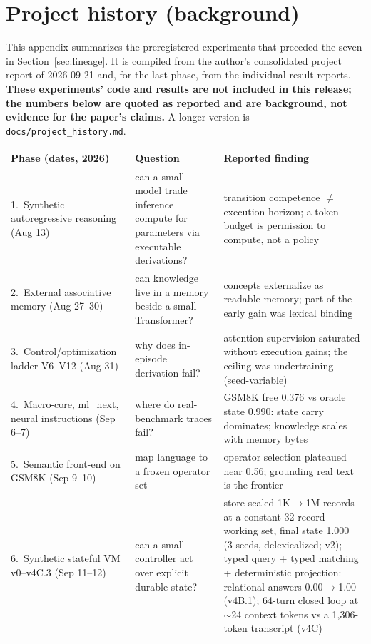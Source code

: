 \documentclass[10pt]{article}
\newcommand{\id}[1]{\nolinkurl{#1}}
\begin{document}
\section{Project history (background)}\label{app:history}
This appendix summarizes the preregistered experiments that preceded the seven in Section~\ref{sec:lineage}. It is compiled from the author's consolidated project report of 2026-09-21 and, for the last phase, from the individual result reports. \textbf{These experiments' code and results are not included in this release; the numbers below are quoted as reported and are background, not evidence for the paper's claims.} A longer version is \id{docs/project_history.md}.

\begin{center}\small
\begin{tabularx}{\linewidth}{@{}>{\raggedright}p{3.3cm}>{\raggedright}p{4.2cm}>{\raggedright\arraybackslash}X@{}}
\toprule
Phase (dates, 2026) & Question & Reported finding \\
\midrule
1.~Synthetic autoregressive reasoning (Aug 13) & can a small model trade inference compute for parameters via executable derivations? & transition competence $\ne$ execution horizon; a token budget is permission to compute, not a policy \\
2.~External associative memory (Aug 27--30) & can knowledge live in a memory beside a small Transformer? & concepts externalize as readable memory; part of the early gain was lexical binding \\
3.~Control/optimization ladder V6--V12 (Aug 31) & why does in-episode derivation fail? & attention supervision saturated without execution gains; the ceiling was undertraining (seed-variable) \\
4.~Macro-core, ml\_next, neural instructions (Sep 6--7) & where do real-benchmark traces fail? & GSM8K free 0.376 vs oracle state 0.990: state carry dominates; knowledge scales with memory bytes \\
5.~Semantic front-end on GSM8K (Sep 9--10) & map language to a frozen operator set & operator selection plateaued near 0.56; grounding real text is the frontier \\
6.~Synthetic stateful VM v0--v4C.3 (Sep 11--12) & can a small controller act over explicit durable state? & store scaled 1K$\rightarrow$1M records at a constant 32-record working set, final state 1.000 (3 seeds, delexicalized; v2); typed query + typed matching + deterministic projection: relational answers 0.00$\rightarrow$1.00 (v4B.1); 64-turn closed loop at $\sim$24 context tokens vs a 1{,}306-token transcript (v4C) \\

\end{tabularx}
\end{center}
\end{document}
